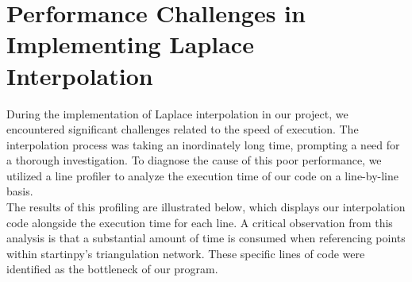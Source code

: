 \documentclass{article}
\begin{document}


\clearpage

\appendix
\section{Performance Challenges in Implementing Laplace Interpolation}
\noindent During the implementation of Laplace interpolation in our project, we encountered significant challenges related to the speed of execution. The interpolation process was taking an inordinately long time, prompting a need for a thorough investigation. To diagnose the cause of this poor performance, we utilized a line profiler to analyze the execution time of our code on a line-by-line basis.\\

\noindent The results of this profiling are illustrated below, which displays our interpolation code alongside the execution time for each line. A critical observation from this analysis is that a substantial amount of time is consumed when referencing points within startinpy's triangulation network. These specific lines of code were identified as the bottleneck of our program.\\
\end{document}
